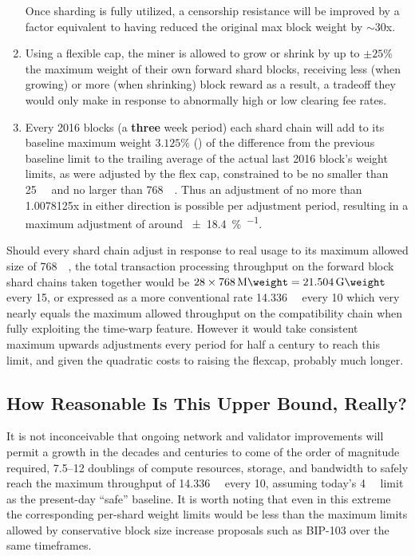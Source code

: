 \begin{enumerate}
Once sharding is fully utilized, a censorship resistance will be
improved by a factor equivalent to having reduced the original max
block weight by $\sim 30$x.

  \item

    Using a flexible cap, the miner is allowed to grow or shrink by up
    to $\pm 25\%$ the maximum weight of their own forward shard
    blocks, receiving less (when growing) or more (when shrinking)
    block reward as a result, a tradeoff they would only make in
    response to abnormally high or low clearing fee rates.

  \item

    Every \num{2016} blocks (a \textbf{three} week period) each shard
    chain will add to its baseline maximum weight $3.125\%$
    () of the difference from the previous baseline limit
    to the trailing average of the actual last \num{2016} block's
    weight limits, as were adjusted by the flex cap, constrained to be
    no smaller than \SI{25}{\kilo\weight} and no larger than
    \SI{768}{\mega\weight}.  Thus an adjustment of no more than
    \num{1.0078125}x in either direction is possible per adjustment
    period, resulting in a maximum adjustment of around
    \SI[per-mode=symbol]{\pm 18.4}{\percent\per\year}.

\end{enumerate}

Should every shard chain adjust in response to real usage to its
maximum allowed size of \SI{768}{\mega\weight}, the total transaction
processing throughput on the forward block shard chains taken together
would be $28 \times \SI{768}{\mega\weight}=\SI{21.504}{\giga\weight}$
every \SI{15}{\min}, or expressed as a more conventional rate
\SI{14.336}{\giga\weight} every \SI{10}{\min} which very nearly equals
the maximum allowed throughput on the compatibility chain when fully
exploiting the time-warp feature.  However it would take consistent
maximum upwards adjustments every period for half a century to reach
this limit, and given the quadratic costs to raising the flexcap,
probably much longer.

\subsection{How Reasonable Is This Upper Bound, Really?}

It is not inconceivable that ongoing network and validator
improvements will permit a growth in the decades and centuries to come
of the order of magnitude required, \numrange{7.5}{12} doublings of
compute resources, storage, and bandwidth to safely reach the maximum
throughput of \SI{14.336}{\giga\weight} every \SI{10}{\min}, assuming
today's \SI{4}{\mega\weight} limit as the present-day ``safe''
baseline.  It is worth noting that even in this extreme the
corresponding per-shard weight limits would be less than the maximum
limits allowed by conservative block size increase proposals such as
BIP-103 over the same timeframes.

